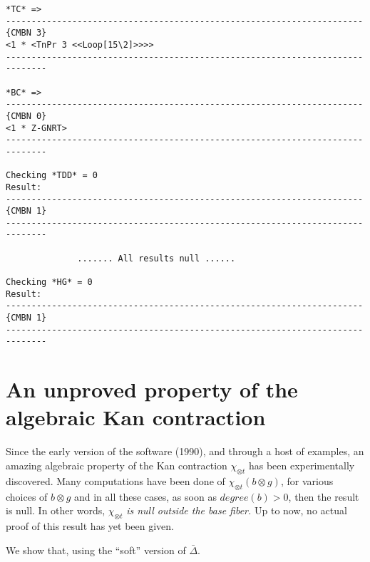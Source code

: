 {\begin{verbatim}
*TC* =>
----------------------------------------------------------------------{CMBN 3}
<1 * <TnPr 3 <<Loop[15\2]>>>>
------------------------------------------------------------------------------

*BC* =>
----------------------------------------------------------------------{CMBN 0}
<1 * Z-GNRT>
------------------------------------------------------------------------------

Checking *TDD* = 0
Result:
----------------------------------------------------------------------{CMBN 1}
------------------------------------------------------------------------------

              ....... All results null ......

Checking *HG* = 0
Result:
----------------------------------------------------------------------{CMBN 1}
------------------------------------------------------------------------------
\end{verbatim}}

\newpage

\section {An unproved property of the algebraic Kan contraction}

Since the early version of the software (1990), and through a host of examples,
an amazing algebraic property of the Kan contraction $\chi_{\otimes t}$ has
been experimentally discovered. Many computations have been done of
$\chi_{\otimes t}(b \otimes g)$, for various choices of $b \otimes g$
and in all these cases,  as soon as $degree(b) > 0$, then the result is null.
In other words,
$\chi_{\otimes t}$ {\em is null outside the base fiber.}
Up to now, no actual proof of this result has yet  been given. \par
We show that, using the ``soft'' version of $\bar{\Delta}$.

